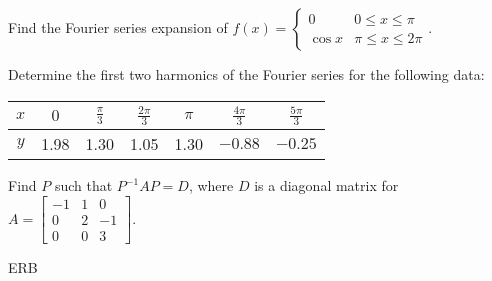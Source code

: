 \documentclass[a4paper,12pt]{vitexam}
\begin{document}
\begin{questions}

     

\question[10]  Find   the Fourier series expansion of 
$ f(x) = \begin{cases}
	0 & 0\leq x \leq \pi \\
	\cos x & \pi \leq x \leq  2\pi
\end{cases}.
$

     

\question[10]  Determine the first two harmonics of the Fourier series for the following data:

\begin{center}
\begin{tabular}{|c|c|c|c|c|c|c|}
	\hline 
	$x$ & $0$ & $\frac {\pi}{3}$ & $\frac {2\pi}{3}$ & $\pi$ & $\frac {4\pi}{3}$ & $\frac {5\pi}{3}$ \\ \hline 
	$y$ & 1.98&1.30&1.05&1.30& $-0.88$ &$-0.25$ \\ \hline 
\end{tabular}
\end{center}

     

\question[10] Find $P$ such that $P^{-1}AP = D$, where $D$ is a diagonal matrix for 
$A = \begin{bmatrix}
	-1 & 1 & 0 \\ 0 & 2 & -1 \\  0 & 0 & 3 
\end{bmatrix}.$

ERB     

\question
{}


\end{questions}
\end{document}
